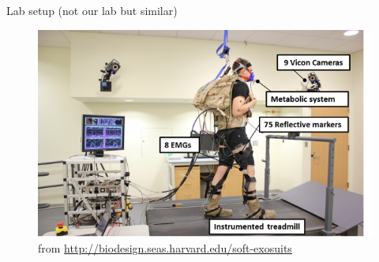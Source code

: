 \documentclass{beamer}
\begin{document}
\begin{frame}{Lab setup (not our lab but similar)}
    \begin{figure}[H]
        \begin{center}
        \includegraphics[height=.7\textheight]{figures/treadmill.png} \\
        \tiny from \url{http://biodesign.seas.harvard.edu/soft-exosuits}
        \end{center}
    \end{figure}
\end{frame}
\end{document}
